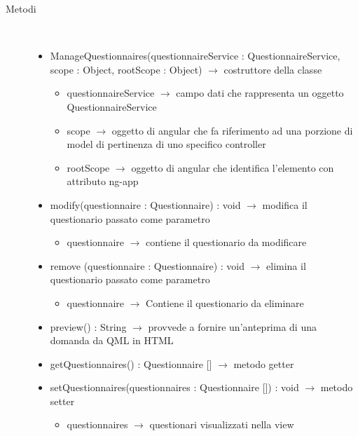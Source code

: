 \begin{description}
\item[Metodi] \hfill \\
\vspace{-7mm}
\begin{itemize}
	\item ManageQuestionnaires(questionnaireService : QuestionnaireService, scope : Object, rootScope : Object) $\rightarrow$ costruttore della classe\begin{itemize}
		\item questionnaireService $\rightarrow$ campo dati che rappresenta un oggetto QuestionnaireService
		\item scope $\rightarrow$ oggetto di angular che fa riferimento ad una porzione di model di pertinenza di uno specifico controller
		\item rootScope $\rightarrow$ oggetto di angular che identifica l’elemento con attributo ng-app
	\end{itemize}
	
	\item modify(questionnaire : Questionnaire) : void $\rightarrow$ modifica il questionario passato come parametro\begin{itemize}
		\item questionnaire $\rightarrow$ contiene il questionario da modificare 
	\end{itemize}
	
	\item remove (questionnaire : Questionnaire) : void $\rightarrow$ elimina il questionario passato come parametro\begin{itemize}
		\item questionnaire $\rightarrow$  Contiene il questionario da eliminare 
	\end{itemize}
	
	\item preview() : String $\rightarrow$ provvede a fornire un'anteprima di una domanda da QML in HTML
	\item getQuestionnaires() : Questionnaire [] $\rightarrow$ metodo getter
	\item setQuestionnaires(questionnaires : Questionnaire []) : void $\rightarrow$ metodo setter\begin{itemize}
		\item questionnaires $\rightarrow$ questionari visualizzati nella view
	\end{itemize}
	
\end{itemize}

\end{description}

